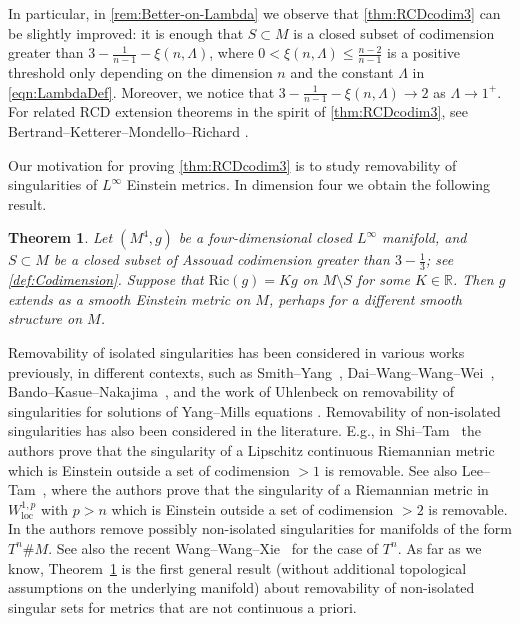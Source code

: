 \documentclass[12pt,a4paper,reqno]{amsart}
\newtheorem{theorem}{Theorem}[section]
\renewcommand{\leq}{\leqslant}
\begin{document}
In particular, in \cref{rem:Better-on-Lambda} we observe that \cref{thm:RCDcodim3} can be slightly improved: it is enough that $S\subset M$ is a closed subset of codimension greater than $3-\frac{1}{n-1}-\xi(n,\Lambda)$, where $0<\xi(n,\Lambda)\leq \frac{n-2}{n-1}$ is a positive threshold only depending on the dimension $n$ and the constant $\Lambda$ in \eqref{eqn:LambdaDef}. Moreover, we notice that $3-\frac{1}{n-1}-\xi(n,\Lambda)\to 2$ as $\Lambda\to 1^+$. For related RCD extension theorems in the spirit of \cref{thm:RCDcodim3}, see Bertrand--Ketterer--Mondello--Richard \cite{BertrandKettererMondelloRichard}.
\smallskip

Our motivation for proving \cref{thm:RCDcodim3} is to study removability of singularities of $L^\infty$ Einstein metrics. In dimension four we obtain the following result.
\begin{theorem}\label{thm:4dEinstein}
    Let $(M^4, g)$ be a four-dimensional closed $L^\infty$ manifold, and $S\subset M$ be a closed subset of Assouad codimension greater than $3-\frac{1}{3}$; see \cref{def:Codimension}. Suppose that $\mathrm{Ric}(g) = Kg$ on $M\setminus S$ for some $K\in \mathbb{R}$. Then $g$ extends as a smooth Einstein metric on $M$, perhaps for a different smooth structure on $M$. 
\end{theorem}

Removability of isolated singularities has been considered in various works previously, in different contexts, such as Smith--Yang~\cite[Theorem 3.1]{SmithYang}, Dai--Wang--Wang--Wei~\cite[Theorem 1.6]{DWWW}, Bando--Kasue--Nakajima~\cite[Theorem 5.1]{BandoKasueNakajima}, and the work of Uhlenbeck on removability of singularities for solutions of Yang--Mills equations \cite[Theorem 4.1]{UhlenbeckYangMills}. Removability of non-isolated singularities has also been considered in the literature. E.g., in Shi--Tam~\cite[Theorem 6.1]{ShiTamPacific} the authors prove that the singularity of a Lipschitz continuous Riemannian metric which is Einstein outside a set of codimension $>1$ is removable. See also Lee--Tam~\cite[Corollary 1.2]{LeeTam}, where the authors prove that the singularity of a Riemannian metric in $W^{1,p}_{\mathrm{loc}}$ with $p>n$ which is Einstein outside a set of codimension $>2$ is removable. In \cite[Theorem 1.2]{DWWW} the authors remove possibly non-isolated singularities for manifolds of the form $T^n\#M$. See also the recent Wang--Wang--Xie~\cite[Theorem 1.5]{WWX26} for the case of $T^n$. As far as we know, Theorem~\ref{thm:4dEinstein} is the first general result (without additional topological assumptions on the underlying manifold) about removability of non-isolated singular sets for metrics that are not continuous a priori.
\smallskip
\end{document}

